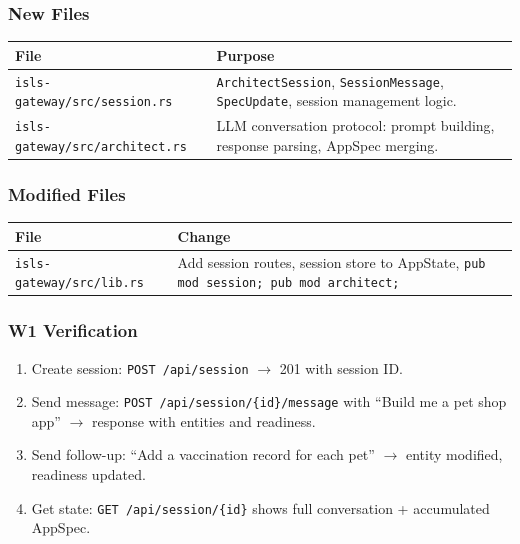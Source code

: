\documentclass[11pt,a4paper]{article}
\begin{document}
\subsubsection{New Files}

\begin{longtable}{lp{10cm}}
\toprule
\textbf{File} & \textbf{Purpose} \\
\midrule
\texttt{isls-gateway/src/session.rs}
  & \texttt{ArchitectSession}, \texttt{SessionMessage}, 
    \texttt{SpecUpdate}, session management logic. \\
\texttt{isls-gateway/src/architect.rs}
  & LLM conversation protocol: prompt building, response 
    parsing, AppSpec merging. \\
\bottomrule
\end{longtable}

\subsubsection{Modified Files}

\begin{longtable}{lp{10cm}}
\toprule
\textbf{File} & \textbf{Change} \\
\midrule
\texttt{isls-gateway/src/lib.rs}
  & Add session routes, session store to AppState, 
    \texttt{pub mod session; pub mod architect;} \\
\bottomrule
\end{longtable}

\subsubsection{W1 Verification}

\begin{enumerate}[nosep]
\item Create session: \texttt{POST /api/session} $\to$ 201 with 
      session ID.
\item Send message: \texttt{POST /api/session/\{id\}/message} 
      with ``Build me a pet shop app'' $\to$ response with 
      entities and readiness.
\item Send follow-up: ``Add a vaccination record for each pet'' 
      $\to$ entity modified, readiness updated.
\item Get state: \texttt{GET /api/session/\{id\}} shows full 
      conversation + accumulated AppSpec.
\end{enumerate}


\end{document}
